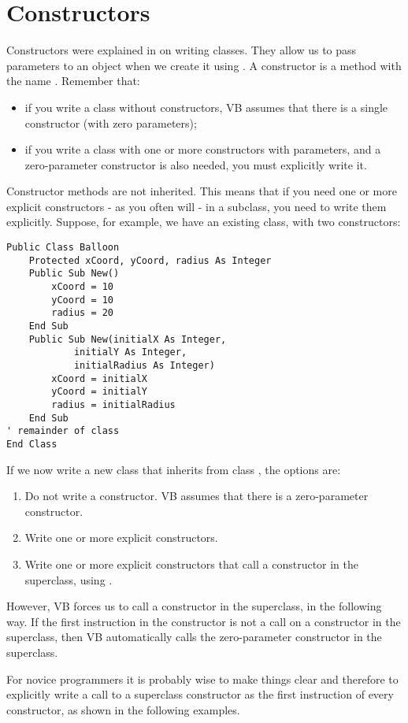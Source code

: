 	\section{Constructors}
		Constructors were explained in  on writing classes. They allow us to pass parameters to an object when we create it using . A constructor is a method with the name . Remember that:
		\begin{itemize}
      \item if you write a class without constructors, VB assumes that there is a single constructor (with zero parameters);
      \item if you write a class with one or more constructors with parameters, and a zero-parameter constructor is also needed, you must explicitly write it.
		\end{itemize}
		Constructor methods are not inherited. This means that if you need one or more explicit constructors - as you often will - in a subclass, you need to write them explicitly. Suppose, for example, we have an existing class, with two constructors:
		\begin{lstlisting}
Public Class Balloon
	Protected xCoord, yCoord, radius As Integer
	Public Sub New()
		xCoord = 10
		yCoord = 10
		radius = 20
	End Sub
	Public Sub New(initialX As Integer,
			initialY As Integer,
			initialRadius As Integer)
		xCoord = initialX
		yCoord = initialY
		radius = initialRadius
	End Sub
' remainder of class
End Class
		\end{lstlisting}
		If we now write a new class that inherits from class , the options are:
		\begin{enumerate}
			\item	Do not write a constructor. VB assumes that there is a zero-parameter constructor.
			\item	Write one or more explicit constructors.
			\item	Write one or more explicit constructors that call a constructor in the superclass, using .
		\end{enumerate}
		However, VB forces us to call a constructor in the superclass, in the following way. If the first instruction in the constructor is not a call on a constructor in the superclass, then VB automatically calls the zero-parameter constructor in the superclass.
		
		For novice programmers it is probably wise to make things clear and therefore to explicitly write a call to a superclass constructor as the first instruction of every constructor, as shown in the following examples.
		
